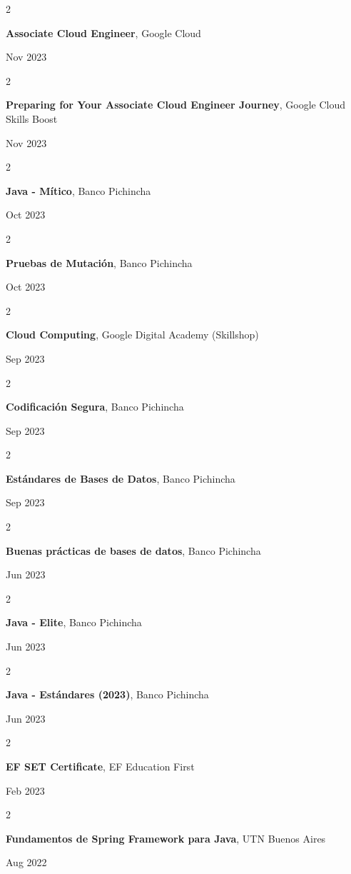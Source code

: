 \documentclass[10pt, letterpaper]{article}
\newenvironment{twocolentry}[2][]{
    \onecolentry
    \def\secondColumn{#2}
    \setcolumnwidth{\fill, 4.5 cm}
    \begin{paracol}{2}
}{
    \switchcolumn \raggedleft \secondColumn
    \end{paracol}
    \endonecolentry
} %
\begin{document}
    \begin{twocolentry}{
            Nov 2023
        }
        \textbf{Associate Cloud Engineer}, Google Cloud
    \end{twocolentry}
    \begin{twocolentry}{
            Nov 2023
        }
        \textbf{Preparing for Your Associate Cloud Engineer Journey}, Google Cloud Skills Boost
    \end{twocolentry}
    \begin{twocolentry}{
            Oct 2023
        }
        \textbf{Java - Mítico}, Banco Pichincha
    \end{twocolentry}
    \begin{twocolentry}{
            Oct 2023
        }
        \textbf{Pruebas de Mutación}, Banco Pichincha
    \end{twocolentry}
    \begin{twocolentry}{
            Sep 2023
        }
        \textbf{Cloud Computing}, Google Digital Academy (Skillshop)
    \end{twocolentry}
    \begin{twocolentry}{
            Sep 2023
        }
        \textbf{Codificación Segura}, Banco Pichincha
    \end{twocolentry}
    \begin{twocolentry}{
            Sep 2023
        }
        \textbf{Estándares de Bases de Datos}, Banco Pichincha
    \end{twocolentry}
    \begin{twocolentry}{
            Jun 2023
        }
        \textbf{Buenas prácticas de bases de datos}, Banco Pichincha
    \end{twocolentry}
    \begin{twocolentry}{
            Jun 2023
        }
        \textbf{Java - Elite}, Banco Pichincha
    \end{twocolentry}
    \begin{twocolentry}{
            Jun 2023
        }
        \textbf{Java - Estándares (2023)}, Banco Pichincha
    \end{twocolentry}
    \begin{twocolentry}{
            Feb 2023
        }
        \textbf{EF SET Certificate}, EF Education First
    \end{twocolentry}
    \begin{twocolentry}{
            Aug 2022
        }
        \textbf{Fundamentos de Spring Framework para Java}, UTN Buenos Aires
    \end{twocolentry}
\end{document}
